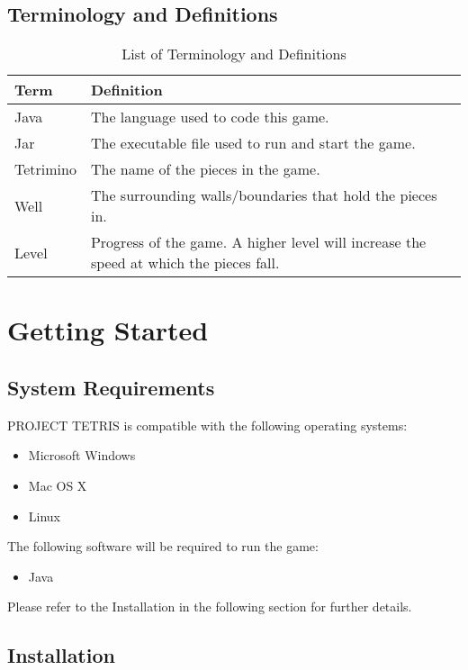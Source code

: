 \documentclass[12pt, titlepage]{article}
\begin{document}
\subsection{Terminology and Definitions}
\begin{table}[H]
\centering
\begin{tabular}{p{} p{}}
\toprule
\textbf{Term} & \textbf{Definition}\\
\midrule
Java & The language used to code this game.\\
Jar & The executable file used to run and start the game.\\
Tetrimino & The name of the pieces in the game.\\
Well & The surrounding walls/boundaries that hold the pieces in.\\
Level & Progress of the game. A higher level will increase the speed at which the pieces fall.\\
\bottomrule
\end{tabular}
\caption{List of Terminology and Definitions}
\label{TblD}
\end{table}

\section{Getting Started}

\subsection{System Requirements}
PROJECT TETRIS is compatible with the following operating systems:
\begin{itemize}
  \item Microsoft Windows
  \item Mac OS X
  \item Linux
\end{itemize}

\noindent
The following software will be required to run the game:
\begin{itemize}
  \item Java
\end{itemize}

\noindent
Please refer to the Installation in the following section for further details.

\subsection{Installation}
\end{document}
